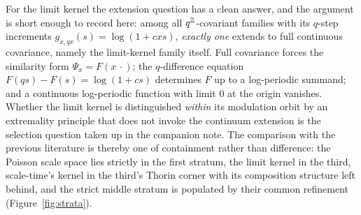 \begin{remark}
For the limit kernel the extension question has a clean answer, and the argument is short
enough to record here: among all $q^{\mathbb{Z}}$-covariant families with its $q$-step increments
$g_{x,qx}(s) = \log(1 + c x s)$, \emph{exactly one} extends to full continuous covariance,
namely the limit-kernel family itself. Full covariance forces the similarity form
$\Psi_x = F(x\,\cdot)$; the $q$-difference equation $F(qs) - F(s) = \log(1+cs)$ determines
$F$ up to a log-periodic summand; and a continuous log-periodic function with limit $0$ at
the origin vanishes. Whether the limit kernel is distinguished \emph{within} its modulation orbit
by an extremality principle that does not invoke the continuum extension is the selection
question taken up in the companion note. The comparison with the previous literature is
thereby one of containment rather than difference: the Poisson scale space lies strictly in
the first stratum, the limit kernel in the third, scale-time's kernel in the third's
Thorin corner with its composition structure left behind, and the strict middle stratum is
populated by their common refinement (Figure~\ref{fig:strata}).
\end{remark}


